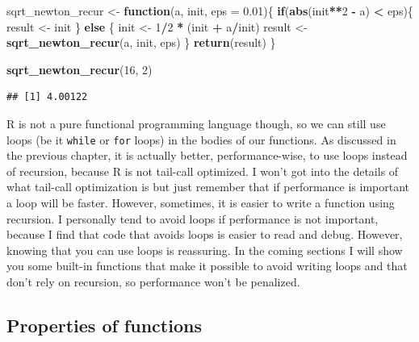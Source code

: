 \documentclass[]{gitbook}
\newenvironment{Shaded}{\begin{snugshade}}{\end{snugshade}}
\newcommand{\ControlFlowTok}[1]{\textcolor[rgb]{0.13,0.29,0.53}{\textbf{#1}}}
\newcommand{\DataTypeTok}[1]{\textcolor[rgb]{0.13,0.29,0.53}{#1}}
\newcommand{\DecValTok}[1]{\textcolor[rgb]{0.00,0.00,0.81}{#1}}
\newcommand{\FloatTok}[1]{\textcolor[rgb]{0.00,0.00,0.81}{#1}}
\newcommand{\KeywordTok}[1]{\textcolor[rgb]{0.13,0.29,0.53}{\textbf{#1}}}
\newcommand{\NormalTok}[1]{#1}
\newcommand{\OperatorTok}[1]{\textcolor[rgb]{0.81,0.36,0.00}{\textbf{#1}}}
\newcommand{\StringTok}[1]{\textcolor[rgb]{0.31,0.60,0.02}{#1}}
\theoremstyle{definition}
\theoremstyle{definition}
\theoremstyle{definition}
\theoremstyle{remark}
\begin{document}
\begin{Shaded}
\begin{Highlighting}[]
\NormalTok{sqrt_newton_recur <-}\StringTok{ }\ControlFlowTok{function}\NormalTok{(a, init, }\DataTypeTok{eps =} \FloatTok{0.01}\NormalTok{)\{}
    \ControlFlowTok{if}\NormalTok{(}\KeywordTok{abs}\NormalTok{(init}\OperatorTok{**}\DecValTok{2} \OperatorTok{-}\StringTok{ }\NormalTok{a) }\OperatorTok{<}\StringTok{ }\NormalTok{eps)\{}
\NormalTok{        result <-}\StringTok{ }\NormalTok{init}
\NormalTok{    \} }\ControlFlowTok{else}\NormalTok{ \{}
\NormalTok{        init <-}\StringTok{ }\DecValTok{1}\OperatorTok{/}\DecValTok{2} \OperatorTok{*}\StringTok{ }\NormalTok{(init }\OperatorTok{+}\StringTok{ }\NormalTok{a}\OperatorTok{/}\NormalTok{init)}
\NormalTok{        result <-}\StringTok{ }\KeywordTok{sqrt_newton_recur}\NormalTok{(a, init, eps)}
\NormalTok{    \}}
    \KeywordTok{return}\NormalTok{(result)}
\NormalTok{\}}
\end{Highlighting}
\end{Shaded}

\begin{Shaded}
\begin{Highlighting}[]
\KeywordTok{sqrt_newton_recur}\NormalTok{(}\DecValTok{16}\NormalTok{, }\DecValTok{2}\NormalTok{)}
\end{Highlighting}
\end{Shaded}

\begin{verbatim}
## [1] 4.00122
\end{verbatim}

R is not a pure functional programming language though, so we can still
use loops (be it \texttt{while} or \texttt{for} loops) in the bodies of
our functions. As discussed in the previous chapter, it is actually
better, performance-wise, to use loops instead of recursion, because R
is not tail-call optimized. I won't got into the details of what
tail-call optimization is but just remember that if performance is
important a loop will be faster. However, sometimes, it is easier to
write a function using recursion. I personally tend to avoid loops if
performance is not important, because I find that code that avoids loops
is easier to read and debug. However, knowing that you can use loops is
reassuring. In the coming sections I will show you some built-in
functions that make it possible to avoid writing loops and that don't
rely on recursion, so performance won't be penalized.

\hypertarget{properties-of-functions}{%
\subsection{Properties of functions}\label{properties-of-functions}}
\end{document}
